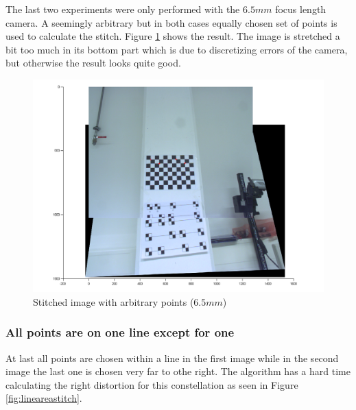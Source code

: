 \documentclass[
a4paper,     %
12pt         %
]{scrartcl}  %
\begin{document}
The last two experiments were only performed with the $6.5mm$ focus length camera.
A seemingly arbitrary but in both cases equally chosen set of points is used to calculate the stitch.
Figure \ref{fig:arbitraryareastitch} shows the result.
The image is stretched a bit too much in its bottom part which is due to discretizing errors of the camera, but otherwise the result looks quite good.

\begin{figure}[ht!]
 \centering
 \includegraphics[scale=0.4]{./Bildg_Messtechnik_Lab/PanoramaStitching/figb4.png}
 \caption{Stitched image with arbitrary points ($6.5mm$)}
 \label{fig:arbitraryareastitch}
\end{figure}

\subsubsection{All points are on one line except for one}

At last all points are chosen within a line in the first image while in the second image the last one is chosen very far to othe right.
The algorithm has a hard time calculating the right distortion for this constellation as seen in Figure \ref{fig:lineareastitch}.
\end{document}

